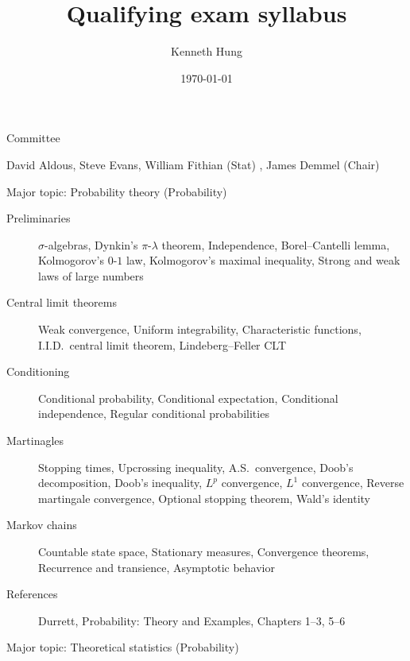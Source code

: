 \documentclass{article}
\begin{document}
\title{Qualifying exam syllabus}
\author{Kenneth Hung}
\date{\today}
\maketitle

\begin{center}
{\sc Committee}

David Aldous, Steve Evans, William Fithian (Stat) , James Demmel (Chair)
\end{center}

\vspace{0.2in}

\begin{center}
{\sc Major topic: Probability theory (Probability)}
\end{center}

\begin{description}
\item[Preliminaries] $\sigma$-algebras, Dynkin's $\pi$-$\lambda$ theorem, Independence, Borel--Cantelli lemma, Kolmogorov's $0$-$1$ law, Kolmogorov's maximal inequality, Strong and weak laws of large numbers

\item[Central limit theorems] Weak convergence, Uniform integrability, Characteristic functions, I.I.D.\ central limit theorem, Lindeberg--Feller CLT

\item[Conditioning] Conditional probability, Conditional expectation, Conditional independence, Regular conditional probabilities

\item[Martinagles] Stopping times, Upcrossing inequality, A.S.\ convergence, Doob's decomposition, Doob's inequality, $L^p$ convergence, $L^1$ convergence, Reverse martingale convergence, Optional stopping theorem, Wald's identity

\item[Markov chains] Countable state space, Stationary measures, Convergence theorems, Recurrence and transience, Asymptotic behavior

\item[References] Durrett, Probability: Theory and Examples, Chapters 1--3, 5--6
\end{description}

\vspace{0.2in}

\begin{center}
{\sc Major topic: Theoretical statistics (Probability)}
\end{center}
\end{document}

